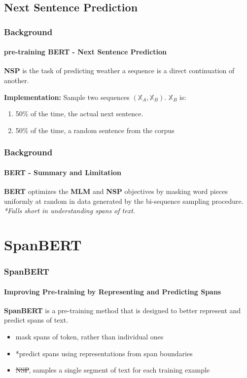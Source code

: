 \documentclass[12pt]{beamer}
\begin{document}
	\subsection{Next Sentence Prediction}
	\begin{frame}
		\frametitle{Background}
		\framesubtitle{pre-training BERT - Next Sentence Prediction}
		
		{ \large
			\textbf{NSP} is the task of predicting weather a sequence is a direct continuation of another.
		} \newline
		
		\textbf{Implementation:} \cite{revspan} Sample two sequences $(\mathbb{X}_{A}, \mathbb{X}_{B})$. \newline $\mathbb{X}_{B}$ is:
		\begin{enumerate}
			\item 50\% of the time, the actual next sentence.
			\item 50\% of the time, a random sentence from the corpus
		\end{enumerate}
		
	\end{frame}
	
	\begin{frame}
	\frametitle{Background}
	\framesubtitle{BERT - Summary and Limitation}
		
		{ \large
			\textbf{BERT} optimizes the \textbf{MLM} and \textbf{NSP} objectives by masking word pieces uniformly at random in data generated by the bi-sequence sampling procedure.	\newline \newline
		}	
			\textit{*Falls short in understanding spans of text.}
		
	\end{frame}
	
	\section{SpanBERT}
	\begin{frame}
		\frametitle{SpanBERT}
		\framesubtitle{Improving Pre-training by Representing and Predicting Spans}
		
		{ \large
			\textbf{SpanBERT} \cite{metasbert} is a pre-training method that is designed to better represent and predict spans of text.
		} \newline
		
		\begin{itemize}
			\item mask spans of token, rather than individual ones
			\item *predict spans using representations from span boundaries
			\item \sout{NSP}, samples a single segment of text for each training example
		\end{itemize}
		
	\end{frame}
	
\end{document}
